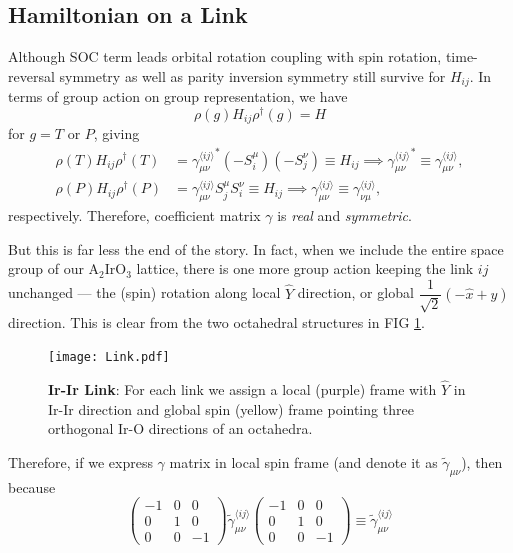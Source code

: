 \documentclass[10pt,nofootinbib]{revtex4}
\begin{document}
	\subsection{Hamiltonian on a Link}
		Although SOC term leads orbital rotation coupling with spin rotation, time-reversal symmetry as well as parity inversion symmetry still survive for $H_{ij}$. In terms of group action on group representation, we have
		\begin{equation}\label{2.1.1}
			\rho(g) H_{ij}\rho^\dagger(g)=H
		\end{equation}
		for $g=T$ or $P$, giving
		\begin{align}
			\rho(T) H_{ij}\rho^\dagger(T)&={\gamma_{\mu\nu}^{\langle ij \rangle }}^*(-S_i^\mu)(-S_j^\nu)\equiv H_{ij}\implies{\gamma^{\langle ij \rangle}_{\mu\nu}}^*\equiv\gamma_{\mu\nu}^{\langle ij \rangle },\label{2.1.2}\\
			\rho(P) H_{ij}\rho^\dagger(P)&=\gamma_{\mu\nu}^{\langle ij \rangle }S_j^\mu S_i^\nu\equiv H_{ij}\implies\gamma_{\mu\nu}^{\langle ij \rangle }\equiv\gamma_{\nu\mu}^{\langle ij \rangle },\label{2.1.3}
		\end{align}
		respectively. Therefore, coefficient matrix $\gamma$ is \emph{real} and \emph{symmetric}.\par
		But this is far less the end of the story. In fact, when we include the entire space group of our $\mathrm{A_2IrO_3}$ lattice, there is one more group action keeping the link $ij$ unchanged --- the (spin) rotation along local $\hat{Y}$ direction, or global $\dfrac{1}{\sqrt{2}}(-\hat{x}+\hat{y})$ direction. This is clear from the two octahedral structures in FIG \ref{fig:Link}.\par
		\begin{figure}[!htp]
			\centering
			\texttt{[image: Link.pdf]}
			\caption{{\bf Ir-Ir Link}: For each link we assign a local (purple) frame with $\hat{Y}$ in Ir-Ir direction and global spin (yellow) frame pointing three orthogonal Ir-O directions of an octahedra.}
			\label{fig:Link}
		\end{figure}
		Therefore, if we express $\gamma$ matrix in local spin frame (and denote it as $\widetilde{\gamma}_{\mu\nu}$), then because
		\begin{equation*}
			\left(\begin{array}{ccc}
				-1 & 0 & 0 \\ 0 & 1 & 0 \\ 0 & 0 & -1
			\end{array}\right)\widetilde{\gamma}_{\mu\nu}^{\langle ij \rangle }
			\left(\begin{array}{ccc}
				-1 & 0 & 0 \\ 0 & 1 & 0 \\ 0 & 0 & -1
			\end{array}\right)\equiv\widetilde{\gamma}_{\mu\nu}^{\langle ij \rangle }
		\end{equation*}
\end{document}
